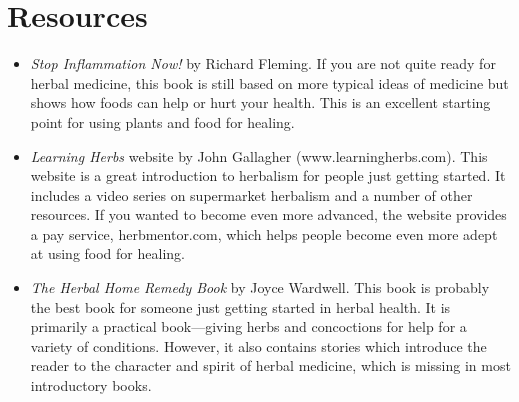 \documentclass[letterpaper]{article}
\begin{document}
\section[Resources]{Resources}
\begin{itemize}
\item {\color{black}
\textit{Stop Inflammation Now!} by Richard Fleming. If you are not quite
ready for herbal medicine, this book is still based on more typical
ideas of medicine but shows how foods can help or hurt your health.
This is an excellent starting point for using plants and food for
healing.}
\item {\color{black}
\textit{Learning Herbs} website by John Gallagher
(www.learningherbs.com). This website is a great introduction to
herbalism for people just getting started. It includes a video series
on supermarket herbalism and a number of other resources. If you wanted
to become even more advanced, the website provides a pay service,
herbmentor.com, which helps people become even more adept at using food
for healing.}
\item {\color{black}
\textit{The Herbal Home Remedy Book} by Joyce Wardwell. This book is
probably the best book for someone just getting started in herbal
health. It is primarily a practical book—giving herbs and concoctions
for help for a variety of conditions. However, it also contains stories
which introduce the reader to the character and spirit of herbal
medicine, which is missing in most introductory books.}
\end{itemize}

\bigskip
\end{document}
